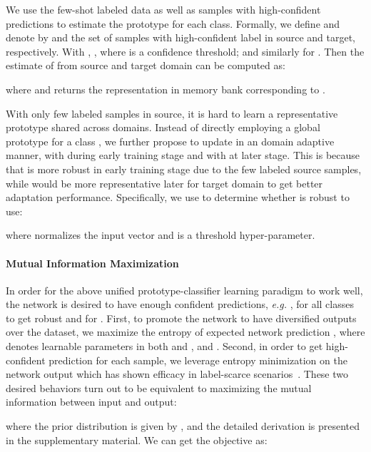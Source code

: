 \documentclass[final]{cvpr}
\begin{document}
We  use the few-shot labeled data as well as samples with high-confident predictions to estimate the prototype for each class. Formally, we define  and denote by  and  the set of samples with high-confident label  in source and target, respectively.
With , 
, where  is a confidence threshold; and similarly for . Then the estimate of  from source and target domain can be computed as:

where  and  returns the representation in memory bank corresponding to . 

With only few labeled samples in source, it is hard to learn a representative prototype shared across domains. Instead of directly employing a global prototype for a class , we further propose to update  in an domain adaptive manner, with  during early training stage and with  at later stage. This is because that  is more robust in early training stage due to the few labeled source samples, while  would be more representative later for target domain to get better adaptation performance. Specifically, we use  to determine whether  is robust to use:

where  normalizes the input vector and  is a threshold hyper-parameter. \paragraph{Mutual Information Maximization}
In order for the above unified prototype-classifier learning paradigm to work well, the network is desired to have enough confident predictions, \textit{e.g.} , for all classes to get robust  and  for . 
First, to promote the network to have diversified outputs over the dataset, we maximize the entropy of expected network prediction , where  denotes learnable parameters in both  and , and . Second, in order to get high-confident prediction for each sample, we leverage entropy minimization on the network output which has shown efficacy in label-scarce scenarios~\cite{grandvalet2005semi, berthelot2019mixmatch}. 
These two desired behaviors turn out to be equivalent to maximizing the mutual information between input and output: 

where the prior distribution  is given by , and the detailed derivation is presented in the supplementary material. We can get the objective as:
\end{document}
